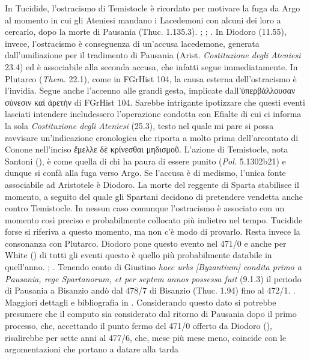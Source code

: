 {            In Tucidide, l'ostracismo di Temistocle è ricordato per motivare la fuga da Argo al momento in cui gli Ateniesi mandano i Lacedemoni con alcuni dei loro a cercarlo, dopo la morte di Pausania  (Thuc. 1.135.3). \cite[55]{Konishi1970}; \cite[174]{Ellis1994}; \cite[107-109]{Westlake1977}. In  Diodoro (11.55), invece, l'ostracismo è conseguenza di un'accusa lacedemone, generata dall'umiliazione per il tradimento di Pausania  (Arist. \emph{Costituzione degli Ateniesi} 23.4) ed è associabile alla seconda accusa, che infatti segue immediatamente. In Plutarco (\emph{Them.}   22.1), come in FGrHist 104, la causa esterna  dell'ostracismo è l'invidia. Segue anche l'accenno alle grandi gesta, implicate dall'\textgreek{ὑπερβάλλουσαν σύνεσιν καὶ ἀρετὴν} di FGrHist 104. Sarebbe intrigante ipotizzare che questi eventi lasciati intendere includessero l'operazione condotta con Efialte di cui ci informa la sola \emph{Costituzione degli Ateniesi} (25.3), testo nel quale mi pare si possa ravvisare un'indicazione cronologica che riporta a molto prima dell'arcontato di Conone  nell'inciso \textgreek{ἔμελλε δὲ κρίνεσθαι μηδισμοῦ}. L'azione di Temistocle, nota Santoni (\cite*[188]{Santoni1999}), è come quella di chi ha paura di essere punito (\emph{Pol.} 5.1302b21) e dunque si confà alla fuga verso Argo. Se l'accusa è di medismo, l'unica fonte associabile ad Aristotele è Diodoro. La morte del reggente di Sparta stabilisce il momento, a seguito del quale gli Spartani decidono di pretendere vendetta anche contro Temistocle. In nessun caso comunque l'ostracismo è associato con un momento così preciso e probabilmente collocato più indietro nel tempo. Tucidide forse si riferiva a questo momento, ma non c'è modo di provarlo. Resta invece la consonanza con Plutarco.  Diodoro pone questo evento nel 471/0 e anche per White (\cite[146]{White1964}) di tutti gli eventi questo è quello più probabilmente databile in quell'anno. \cite[46]{Cole1978}; \cite[222]{CulassoGastaldi1990}. Tenendo conto di Giustino\emph{ haec urbs [Byzantium] condita primo a Pausania, rege Spartanorum, et per septem annos possessa fuit} (9.1.3) il periodo di Pausania  a Bisanzio andò dal 478/7 di Bisanzio (Thuc. 1.94) fino al 472/1. \cite[267]{Fornara1966}. Maggiori dettagli e bibliografia in \cite{Liuzzo2010}. Considerando questo dato si potrebbe presumere che il computo sia considerato dal ritorno di Pausania  dopo il primo processo, che, accettando il punto fermo del 471/0 offerto da  Diodoro (\cite[206]{Giorgini2004}), risalirebbe per sette anni al 477/6, che, mese più mese meno, coincide con le argomentazioni che portano a datare alla tarda }
